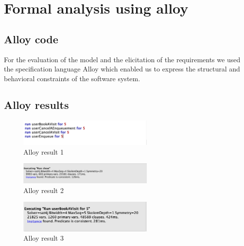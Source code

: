 \section{Formal analysis using alloy}
\label{sect:formalanalysisusingalloy}

\subsection{Alloy code}
\label{subsect:alloycode}

For the evaluation of the model and the elicitation of the requirements we used the specification language Alloy which enabled us to express the structural and behavioral constraints of the software system.
\newline


\subsection{Alloy results}
\label{subsect:alloyresults}

\begin{figure}[h!]
    \centering
    \includegraphics[width=0.6\textwidth]{Images/alloy/runs.png}
    \caption{\label{fig:runs}{Alloy result 1}}
\end{figure}

\begin{figure}[h!]
    \centering
    \includegraphics[width=0.6\textwidth]{Images/alloy/runshow.png}
    \caption{\label{fig:runshow}{Alloy result 2}}
\end{figure}

\begin{figure}[h!]
    \centering
    \includegraphics[width=0.6\textwidth]{Images/alloy/userbooksavisit.png}
    \caption{\label{fig:userbooksavisitalloy}{Alloy result 3}}
\end{figure}

